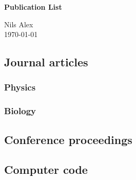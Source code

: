 \documentclass[%
english,
12pt,
twoside=false,
headsepline,
numbers=noenddot,
parskip=half,
a4paper,
final
]{scrarticle}
\begin{document}
\enlargethispage{\baselineskip}

\begin{center}
  \large \bfseries\sffamily Publication List

  \normalsize\normalfont Nils Alex \\ \today
\end{center}

\subsection*{Journal articles}
\subsubsection*{Physics}



\subsubsection*{Biology}


\subsection*{Conference proceedings}



\subsection*{Computer code}



\end{document}
